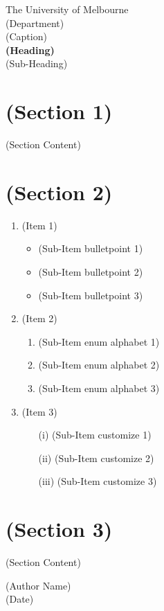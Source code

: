\documentclass[11pt]{article}
\begin{document}
\begin{center}
{\sc The University of Melbourne
\\
(Department)
\\ 
(Caption)}
\bigskip \\
{\Large\bf (Heading)}
\bigskip \\
{\large (Sub-Heading)}
\end{center}

\section*{(Section 1)}
(Section Content)


\section*{(Section 2)}

\hfill
\begin{enumerate}

\item	(Item 1)
\begin{itemize}
\item (Sub-Item bulletpoint 1)
\item (Sub-Item bulletpoint 2)
\item (Sub-Item bulletpoint 3)
\end{itemize}

\hfill
\item	(Item 2)
\begin{enumerate}
\item (Sub-Item enum alphabet 1)
\item (Sub-Item enum alphabet 2)
\item (Sub-Item enum alphabet 3)
\end{enumerate}

\hfill
\item	(Item 3)
\begin{enumerate}
\item[(i)] (Sub-Item customize 1)
\item[(ii)] (Sub-Item customize 2)
\item[(iii)] (Sub-Item customize 3)
\end{enumerate}

\end{enumerate}

\section*{(Section 3)}
(Section Content)

\begin{flushright}
(Author Name)
\\ (Date)
\end{flushright}
\end{document}
